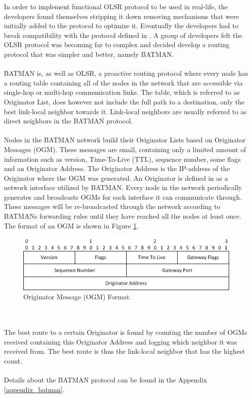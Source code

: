 \noindent
In order to implement functional OLSR protocol to be used in real-life, the developers found themselves stripping it down removing mechanisms that were initially added to the protocol to optimize it. Eventually the developers had to break compatibility with the protocol defined in \cite{clausen2003rfc3626}. A group of developers felt the OLSR protocol was becoming far to complex and decided develop a routing protocol that was simpler and better, namely BATMAN.
\\\\
BATMAN is, as well as OLSR, a proactive routing protocol where every node has a routing table containing all of the nodes in the network that are accessible via single-hop or multi-hop communication links. The table, which is referred to as Originator List, does however not include the full path to a destination, only the best link-local neighbor towards it. Link-local neighbors are usually referred to as direct neighbors in the BATMAN protocol.
\\\\
Nodes in the BATMAN network build their Originator Lists based on Originator Messages (OGM). These messages are small, containing only a limited amount of information such as version, Time-To-Live (TTL), sequence number, some flags and an Originator Address. The Originator Address is the IP-address of the Originator where the OGM was generated. An Originator is defined in \cite{batman_rfc} as a network interface utilized by BATMAN. Every node in the network periodically generates and broadcasts OGMs for each interface it can communicate through. These messages will be re-broadcasted through the network according to BATMANs forwarding rules until they have reached all the nodes at least once. The format of an OGM is shown in Figure \ref{fig:ogm}.

\begin{figure}[ht]
	\centering
		\includegraphics{images/ogm.png}
	\caption{Originator Message (OGM) Format.}
	\label{fig:ogm}
\end{figure}

\noindent
\\\\
The best route to a certain Originator is found by counting the number of OGMs received containing this Originator Address and logging which neighbor it was received from. The best route is thus the link-local neighbor that has the highest count.
\\\\
Details about the BATMAN protocol can be found in the Appendix \ref{appendix_batman}.

